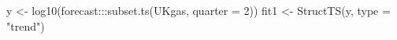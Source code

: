 \begin{Schunk}
\begin{Sinput}
 y <- log10(forecast:::subset.ts(UKgas, quarter = 2))
 fit1 <- StructTS(y, type = "trend")
\end{Sinput}
\end{Schunk}
